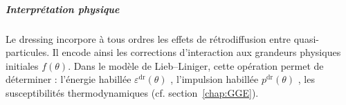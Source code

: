 
\subparagraph{Interprétation physique}

Le dressing incorpore à tous ordres les effets de rétrodiffusion entre quasi-particules. Il encode ainsi les corrections d’interaction aux grandeurs physiques initiales $f(\theta)$. Dans le modèle de Lieb–Liniger, cette opération permet de déterminer : l’énergie habillée $\varepsilon^{\mathrm{dr}}(\theta)$ , l’impulsion habillée $p^{\mathrm{dr}}(\theta)$ , les susceptibilités thermodynamiques (cf. section~\ref{chap:GGE}).
%
%
%
%
%
%
%
%
%
%
